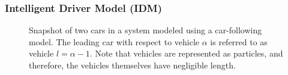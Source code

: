 \documentclass[12pt]{article}
\begin{document}
\subsubsection{Intelligent Driver Model (IDM)}
\begin{figure}
  \centering
  \caption{Snapshot of two cars in a system modeled using a car-following model.  The leading car with respect to vehicle $\alpha$ is referred to as vehicle $l=\alpha-1$.  Note that vehicles are represented as particles, and therefore, the vehicles themselves have negligible length.}
\end{figure}
\end{document}
